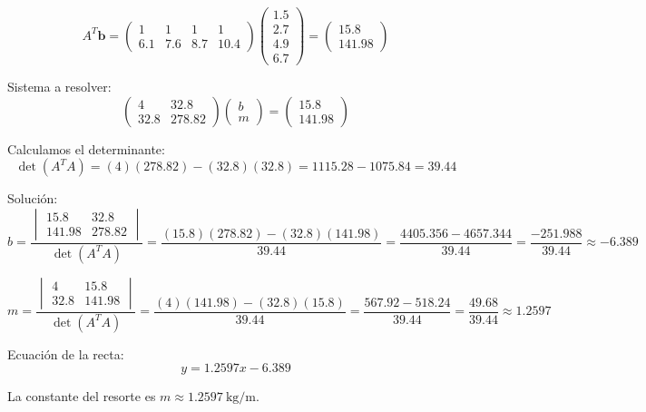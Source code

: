 \begin{prob}
\begin{myproof}
\[
A^T\mathbf{b} = \begin{pmatrix}
1 & 1 & 1 & 1 \\
6.1 & 7.6 & 8.7 & 10.4
\end{pmatrix}
\begin{pmatrix}
1.5 \\ 2.7 \\ 4.9 \\ 6.7
\end{pmatrix} = \begin{pmatrix}
15.8 \\ 141.98
\end{pmatrix}
\]

Sistema a resolver:
\[
\begin{pmatrix}
4 & 32.8 \\
32.8 & 278.82
\end{pmatrix}
\begin{pmatrix}
b \\ m
\end{pmatrix} = 
\begin{pmatrix}
15.8 \\ 141.98
\end{pmatrix}
\]

Calculamos el determinante:
\[
\det(A^TA) = (4)(278.82) - (32.8)(32.8) = 1115.28 - 1075.84 = 39.44
\]

Solución:
\[
b = \frac{
\begin{vmatrix}
15.8 & 32.8 \\
141.98 & 278.82
\end{vmatrix}
}{\det(A^TA)} = \frac{(15.8)(278.82) - (32.8)(141.98)}{39.44} = \frac{4405.356 - 4657.344}{39.44} = \frac{-251.988}{39.44} \approx -6.389
\]

\[
m = \frac{
\begin{vmatrix}
4 & 15.8 \\
32.8 & 141.98
\end{vmatrix}
}{\det(A^TA)} = \frac{(4)(141.98) - (32.8)(15.8)}{39.44} = \frac{567.92 - 518.24}{39.44} = \frac{49.68}{39.44} \approx 1.2597
\]

Ecuación de la recta:
\[
\boxed{y = 1.2597x - 6.389}
\]

La constante del resorte es \(m \approx 1.2597\ \text{kg/m}\).


\end{myproof}
\end{prob}
